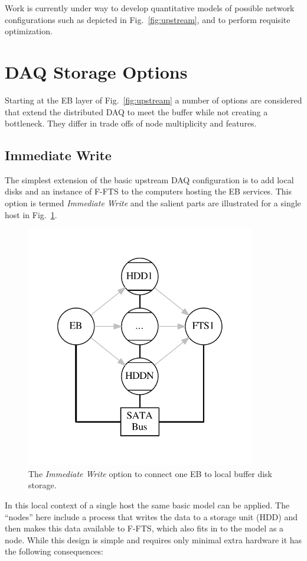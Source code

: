 \documentclass[pdftex,12pt,letter]{article}
\begin{document}
Work is currently under way to develop quantitative models of possible
network configurations such as depicted in Fig.~\ref{fig:upstream},
and to perform requisite optimization.


\section{DAQ Storage Options}

Starting at the EB layer of Fig.~\ref{fig:upstream} a number of
options are considered that extend the distributed DAQ to meet the
buffer while not creating a bottleneck.  They differ in trade offs of
node multiplicity and features.

\subsection{Immediate Write}

The simplest extension of the basic upstream DAQ configuration is to
add local disks and an instance of F-FTS to the computers hosting the
EB services.  This option is termed \textit{Immediate Write} and the salient
parts are illustrated for a single host in Fig.~\ref{fig:immediate}.

\begin{figure}[htbp]
  \centering
  \includegraphics[width=10cm]{eb2ld.pdf}
  \caption{The \textit{Immediate Write} option to connect one EB to local
    buffer disk storage.}
  \label{fig:immediate}
\end{figure}

In this local context of a single host the same basic model can be
applied.  The ``nodes'' here include a process that writes the data to
a storage unit (HDD) and then makes this data available to F-FTS,
which also fits in to the model as a node. While this design is simple and requires only minimal extra hardware
it has the following consequences:  
\end{document}
